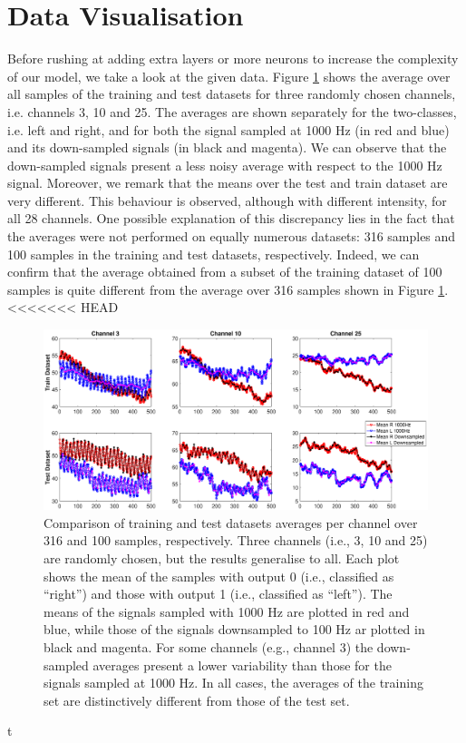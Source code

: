 \documentclass{article}
\begin{document}
 \section{Data Visualisation}\label{sec_visual}
 Before rushing at adding extra layers or more neurons to increase the complexity of our model, we  take a look at the given data. 
 Figure \ref{fig_mean_1000hz_vs_downsampled} shows the average over all samples of the training and test datasets for three randomly chosen channels, i.e. channels 3, 10 and 25. 
The averages are shown separately for the two-classes, i.e. left and right, and for both the signal sampled at 1000 Hz (in red and blue) and its down-sampled signals (in black and magenta). 
We can observe that the down-sampled signals present a less noisy average with respect to the 1000 Hz signal. 
Moreover, we remark that  the means over the test and train dataset are very different. 
This behaviour is observed, although with different intensity, for all 28 channels. 
One possible explanation of this discrepancy lies in the fact that the averages were not performed on equally numerous datasets: 316 samples and 100 samples in the training and test datasets, respectively. 
Indeed, we can confirm that the average obtained from a subset of the training dataset of 100 samples is quite different from the average over 316 samples shown in Figure \ref{fig_mean_1000hz_vs_downsampled}. 
<<<<<<< HEAD
%
 \begin{figure}[h]
 \begin{center}
  \includegraphics[width=1\textwidth]{fig/fig4new_mean_downsampled_vs1000} 
  \caption{Comparison of training and test datasets averages per channel over 316 and 100 samples, respectively.  
  Three channels (i.e., 3, 10 and 25) are randomly chosen, but the results generalise to all. 
  Each plot shows the mean of the samples with output 0 (i.e., classified as ``right'') and those with output 1 (i.e., classified as ``left''). 
  The means of the signals sampled with 1000 Hz are plotted in red and blue, while those of the signals downsampled to 100 Hz ar plotted in black and magenta. 
For some channels (e.g., channel 3) the down-sampled averages present a lower variability than those for the signals sampled at 1000 Hz. 
  In all cases, the averages of the training set are distinctively different from those of the test set. 
  \label{fig_mean_1000hz_vs_downsampled}}
  \end{center}
  \end{figure}t
\end{document}
